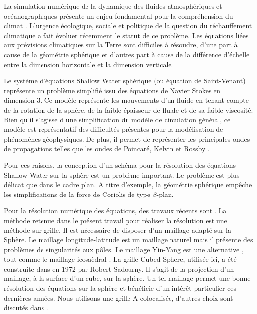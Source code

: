 La simulation numérique de la dynamique des fluides atmosphériques et océanographiques présente un enjeu fondamental pour la compréhension du climat \cite{Cushman2011,Vallis2017}. L'urgence écologique, sociale et politique de la question du réchauffement climatique a fait évoluer récemment le statut de ce problème. Les équations liées aux prévisions climatiques sur la Terre sont difficiles à résoudre, d'une part à cause de la géométrie sphérique et d'autres part à cause de la différence d'échelle entre la dimension horizontale et la dimension verticale. 

Le système d'équations Shallow Water sphérique (ou équation de Saint-Venant) représente un problème simplifié issu des équations de Navier Stokes en dimension 3. Ce modèle représente les mouvements d'un fluide en tenant compte de la rotation de la sphère, de la faible épaisseur de fluide et de sa faible viscosité. Bien qu'il s'agisse d'une simplification du modèle de circulation général, ce modèle est représentatif des difficultés présentes pour la modélisation de phénomènes géophysiques. De plus, il permet de représenter les principales ondes de propagations telles que les ondes de Poincaré, Kelvin et Rossby \cite{Paldor2015}.

Pour ces raisons, la conception d'un schéma pour la résolution des équations Shallow Water sur la sphère est un problème important. Le problème est plus délicat que dans le cadre plan. A titre d'exemple, la géométrie sphérique empêche les simplifications de la force de Coriolis de type $\beta$-plan.

Pour la résolution numérique des équations, des travaux récents sont \cite{Eldred2015, Nair2010, Qaddouri2012, Ullrich2011}. La méthode retenue dans le présent travail pour réaliser la résolution est une méthode sur grille. Il est nécessaire de disposer d'un maillage adapté sur la Sphère. Le maillage longitude-latitude est un maillage naturel mais il présente des problèmes de singularités aux pôles. Le maillage Yin-Yang est une alternative \cite{Kageyama2004, Li2008}, tout comme le maillage icosaèdral \cite{Stuhne1999}. La grille Cubed-Sphere, utilisée ici, a été construite dans \cite{Sadourny1972} en 1972 par Robert Sadourny. Il s'agit de la projection d'un maillage, à la surface d'un cube, sur la sphère. Un tel maillage permet une bonne résolution des équations sur la sphère \cite{Ronchi1996} et bénéficie d'un intérêt particulier ces dernières années. Nous utilisons une grille A-colocalisée, d'autres choix sont discutés dans \cite{Eldred2015}.

